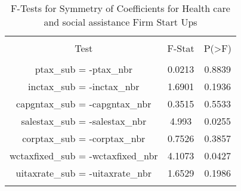 
\begin{table}[!htbp] \centering 
  \caption{F-Tests for Symmetry of Coefficients for Health care and social assistance Firm Start Ups} 
  \label{62Ftests} 
\begin{tabular}{@{\extracolsep{5pt}} ccc} 
\\[-1.8ex]\hline 
\hline \\[-1.8ex] 
Test & F-Stat & P(\textgreater F) \\ 
\hline \\[-1.8ex] 
ptax\_sub = -ptax\_nbr & 0.0213 & 0.8839 \\ 
inctax\_sub = -inctax\_nbr & 1.6901 & 0.1936 \\ 
capgntax\_sub = -capgntax\_nbr & 0.3515 & 0.5533 \\ 
salestax\_sub = -salestax\_nbr & 4.993 & 0.0255 \\ 
corptax\_sub = -corptax\_nbr & 0.7526 & 0.3857 \\ 
wctaxfixed\_sub = -wctaxfixed\_nbr & 4.1073 & 0.0427 \\ 
uitaxrate\_sub = -uitaxrate\_nbr & 1.6529 & 0.1986 \\ 
\hline \\[-1.8ex] 
\end{tabular} 
\end{table} 
